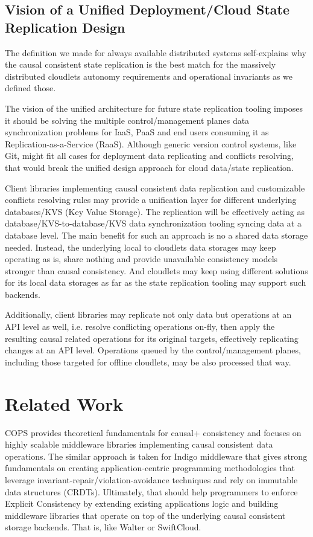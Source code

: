 \documentclass[conference]{IEEEtran}
\begin{document}
\subsection{Vision of a Unified Deployment/Cloud State Replication Design}
The definition we made for always available distributed systems self-explains
why the causal consistent state replication is the best match for the
massively distributed cloudlets autonomy requirements and operational
invariants as we defined those.

The vision of the unified architecture for future state replication tooling
imposes it should be solving the multiple control/management planes data
synchronization problems for IaaS, PaaS and end users consuming it as
Replication-as-a-Service (RaaS). Although generic version control systems, like Git,
might fit all cases for deployment data replicating and conflicts resolving,
that would break the unified design approach for cloud data/state replication.

Client libraries implementing causal consistent data replication and
customizable conflicts resolving rules may provide a unification layer for
different underlying databases/KVS (Key Value Storage). The replication will be
effectively acting as database/KVS-to-database/KVS data synchronization tooling
syncing data at a database level. The main benefit for such an approach is no a
shared data storage needed. Instead, the underlying local to cloudlets data
storages may keep operating as is, share nothing and provide unavailable
consistency models stronger than causal consistency. And cloudlets may keep
using different solutions for its local data storages as far as the state
replication tooling may support such backends.

Additionally, client libraries may replicate not only data but operations at an
API level as well, i.e. resolve conflicting operations on-fly, then apply the
resulting causal related operations for its original targets, effectively
replicating changes at an API level. Operations queued by the
control/management planes, including those targeted for offline cloudlets, may
be also processed that way.

\section{Related Work}
COPS\cite{b1} provides theoretical fundamentals for causal+ consistency and
focuses on highly scalable middleware libraries implementing causal consistent
data operations. The similar approach is taken for Indigo middleware\cite{b10}
that gives strong fundamentals on creating application-centric programming
methodologies that leverage invariant-repair/violation-avoidance techniques and
rely on immutable data structures (CRDTs). Ultimately, that should help
programmers to enforce Explicit Consistency by extending existing applications
logic and building middleware libraries that operate on top of the underlying
causal consistent storage backends. That is, like Walter\cite{b11} or
SwiftCloud\cite{b12}.
\end{document}
